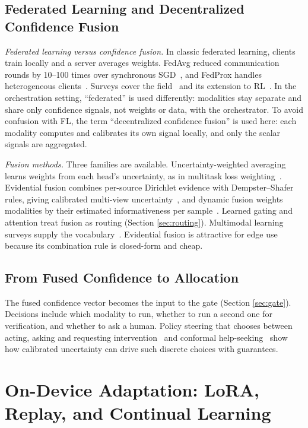 \documentclass[journal]{IEEEtran}
\begin{document}
\subsection{Federated Learning and Decentralized Confidence Fusion}\label{sec:federated}
\textit{Federated learning versus confidence fusion.} In classic federated learning, clients train locally and a server averages weights. FedAvg reduced communication rounds by 10--100 times over synchronous SGD~\cite{McMahan2017}, and FedProx handles heterogeneous clients~\cite{Li2020}. Surveys cover the field~\cite{Kairouz2021} and its extension to RL~\cite{Qi2021}. In the orchestration setting, ``federated'' is used differently: modalities stay separate and share only confidence signals, not weights or data, with the orchestrator. To avoid confusion with FL, the term ``decentralized confidence fusion'' is used here: each modality computes and calibrates its own signal locally, and only the scalar signals are aggregated.

\textit{Fusion methods.} Three families are available. Uncertainty-weighted averaging learns weights from each head's uncertainty, as in multitask loss weighting~\cite{Kendall2018}. Evidential fusion combines per-source Dirichlet evidence with Dempster--Shafer rules, giving calibrated multi-view uncertainty~\cite{Han2021,Han2022a}, and dynamic fusion weights modalities by their estimated informativeness per sample~\cite{Han2022b}. Learned gating and attention treat fusion as routing (Section \ref{sec:routing}). Multimodal learning surveys supply the vocabulary~\cite{Baltrusaitis2019}. Evidential fusion is attractive for edge use because its combination rule is closed-form and cheap.


\subsection{From Fused Confidence to Allocation}\label{sec:allocation}
The fused confidence vector becomes the input to the gate (Section \ref{sec:gate}). Decisions include which modality to run, whether to run a second one for verification, and whether to ask a human. Policy steering that chooses between acting, asking and requesting intervention~\cite{Yuan2026} and conformal help-seeking~\cite{Ren2023,Liang2024} show how calibrated uncertainty can drive such discrete choices with guarantees.


\section{On-Device Adaptation: LoRA, Replay, and Continual Learning}\label{sec:ondevice}
\end{document}
